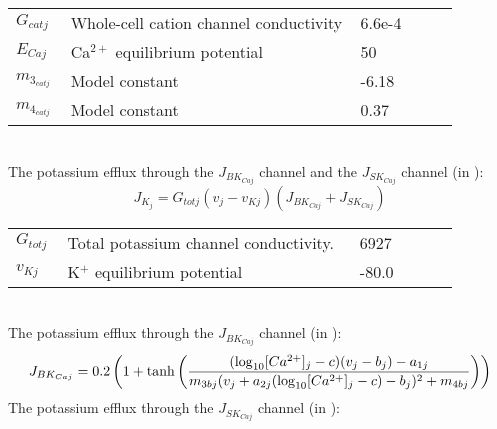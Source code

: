 \begin{table}[h!]
\centering
\begin{tabular}{| p{0.09\linewidth} | >{\footnotesize} p{0.6\linewidth} | >{\footnotesize} p{0.17\linewidth} | >{\footnotesize} p{0.02\linewidth} |}
\arrayrulecolor{lightgrey}\hline
$G_{cat j}$      		& Whole-cell cation channel conductivity						 	& 6.6e-4 \uMpmVs	& \cite{Koenigsberger2006} \\
$E_{Caj}$      			& Ca$^{2+}$ equilibrium potential								 	& 50 \mV		& \cite{Koenigsberger2006} \\

$m_{3_{catj}}$      	& Model constant				 	& -6.18 \uM		& \cite{Koenigsberger2006} \\
$m_{4_{catj}}$      	& Model constant					& 0.37  \uM		& \cite{Koenigsberger2006} \\
\hline
\end{tabular}
\label{tab:Jcationj}
\end{table}
\\
%
The potassium efflux through the $J_{BK_{Caj}}$ channel and the $J_{SK_{Caj}}$ channel (in \uMs):
\begin{equation} \label{eq:JKj}
J_{K_{j}} = G_{totj} (v_{j}-v_{Kj}) \left(   J_{BK_{Caj}} + J_{SK_{Caj}} \right) 
\end{equation}
%
%
\begin{table}[h!]
\centering
\begin{tabular}{| p{0.09\linewidth} | >{\footnotesize} p{0.6\linewidth} | >{\footnotesize} p{0.17\linewidth} | >{\footnotesize} p{0.02\linewidth} |}
\arrayrulecolor{lightgrey}\hline
$G_{totj}$      		& Total potassium channel conductivity.						 		& 6927 \pS		& \cite{Koenigsberger2006} \\
$v_{Kj}$      			& K$^{+}$ equilibrium potential					 			 		& -80.0 \mV		& \cite{Koenigsberger2006} \\
\hline
\end{tabular}
\label{tab:JKj}
\end{table}
\\
%
The potassium efflux through the $J_{BK_{Caj}}$ channel (in \uMs):
\begin{equation} \label{eq:JBKCAj}
J_{BK_{Caj}} = 0.2 \left(   1+ \mathrm{tanh}   \left(   \frac{   (\mathrm{log}_{10} [Ca^{2+}]_{j} - c) (v_{j}-b_{j}) - a_{1j}  }   { m_{3bj} ( v_{j} + a_{2j} (\mathrm{log}_{10} [Ca^{2+}]_{j} -c )-b_{j} )^{2} + m_{4bj} }  \right)     \right)  
\end{equation}
%
The potassium efflux through the $J_{SK_{Caj}}$ channel (in \uMs):
